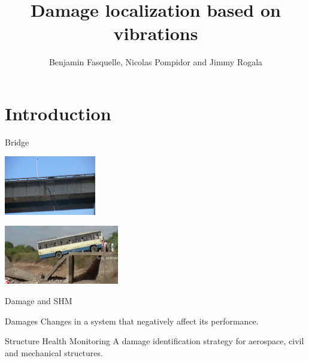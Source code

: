 \documentclass{beamer}
\title{Damage localization based on vibrations}
\author{Benjamin Fasquelle, Nicolas Pompidor and Jimmy Rogala}
\institute{École Normale Supérieure de Rennes, département Informatique et Télécommunications}
\begin{document}




  \begin{frame}
  \titlepage
  \end{frame}




\section{Introduction}

\begin{frame}{Bridge}
\begin{center}
\includegraphics[width=4cm]{images/crack.jpg}

\pause

\includegraphics[width=5cm]{images/bridge.png}
\end{center}
\end{frame}


\begin{frame}{Damage and SHM}
\begin{exampleblock}{Damages}
Changes in a system that negatively affect its performance.
\end{exampleblock}

\begin{exampleblock}{Structure Health Monitoring}
A damage identification strategy for aerospace, civil and mechanical structures.
\end{exampleblock}

\end{frame}
\end{document}
